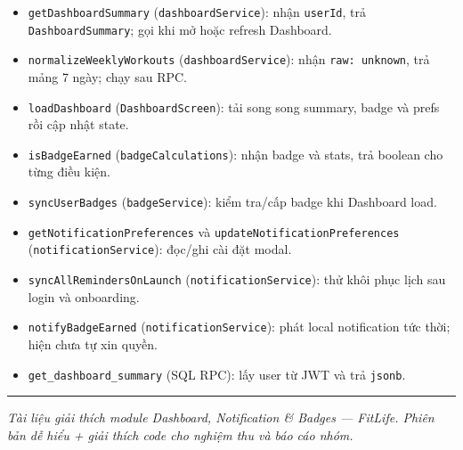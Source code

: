 \documentclass[12pt,a4paper]{article}
\providecommand{\tightlist}{%
  \setlength{\itemsep}{0pt}\setlength{\parskip}{0pt}}
\begin{document}
\begin{itemize}
\tightlist
\item
  \texttt{getDashboardSummary} (\texttt{dashboardService}): nhận
  \texttt{userId}, trả \texttt{DashboardSummary}; gọi khi mở hoặc
  refresh Dashboard.
\item
  \texttt{normalizeWeeklyWorkouts} (\texttt{dashboardService}): nhận
  \texttt{raw:\ unknown}, trả mảng 7 ngày; chạy sau RPC.
\item
  \texttt{loadDashboard} (\texttt{DashboardScreen}): tải song song
  summary, badge và prefs rồi cập nhật state.
\item
  \texttt{isBadgeEarned} (\texttt{badgeCalculations}): nhận badge và
  stats, trả boolean cho từng điều kiện.
\item
  \texttt{syncUserBadges} (\texttt{badgeService}): kiểm tra/cấp badge
  khi Dashboard load.
\item
  \texttt{getNotificationPreferences} và
  \texttt{updateNotificationPreferences} (\texttt{notificationService}):
  đọc/ghi cài đặt modal.
\item
  \texttt{syncAllRemindersOnLaunch} (\texttt{notificationService}): thử
  khôi phục lịch sau login và onboarding.
\item
  \texttt{notifyBadgeEarned} (\texttt{notificationService}): phát local
  notification tức thời; hiện chưa tự xin quyền.
\item
  \texttt{get\_dashboard\_summary} (SQL RPC): lấy user từ JWT và trả
  \texttt{jsonb}.
\end{itemize}

\begin{center}\rule{0.5\linewidth}{0.5pt}\end{center}

\emph{Tài liệu giải thích module Dashboard, Notification \& Badges ---
FitLife. Phiên bản dễ hiểu + giải thích code cho nghiệm thu và báo cáo
nhóm.}
\end{document}
